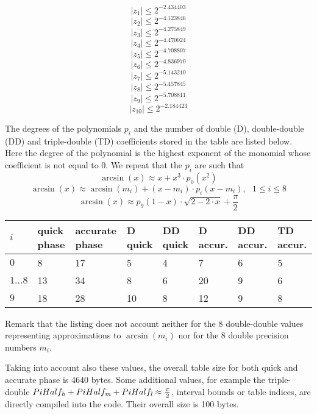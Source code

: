 $$\left \vert z_1 \right \vert  \leq  2^{-2.434403}$$
$$\left \vert z_2 \right \vert  \leq  2^{-4.123846}$$
$$\left \vert z_3 \right \vert  \leq  2^{-4.275849}$$
$$\left \vert z_4 \right \vert  \leq  2^{-4.470024}$$
$$\left \vert z_5 \right \vert  \leq  2^{-4.708807}$$
$$\left \vert z_6 \right \vert  \leq  2^{-4.836970}$$
$$\left \vert z_7 \right \vert  \leq  2^{-5.143210}$$
$$\left \vert z_8 \right \vert  \leq  2^{-5.457845}$$
$$\left \vert z_9 \right \vert  \leq  2^{-5.708811}$$
$$\left \vert z_{10} \right \vert  \leq  2^{-2.184423}$$

The degrees of the polynomials $p_i$ and the number of double (D),
double-double (DD) and triple-double (TD) coefficients stored in the
table are listed below. Here the degree of the polynomial is the
highest exponent of the monomial whose coefficient is not equal to
$0$. We repeat that the $p_i$ are such that
$$\arcsin\left( x \right) \approx x + x^3 \cdot p_0\left( x^2 \right)$$
$$\arcsin\left( x \right) \approx \arcsin\left( m_i \right) + \left(x
- m_i \right) \cdot p_i\left( x - m_i \right), \mbox{~~} 1 \leq i \leq
8$$
$$\arcsin\left( x \right) \approx p_9\left( 1 - x \right) \cdot \sqrt{2 - 2\cdot x} + \frac{\pi}{2}$$

\begin{center}
\begin{tabular}{|l|l|l|l|l|l|l|l|}
\hline
$i$ & quick phase & accurate phase & D quick & DD quick & D accur. & DD accur. & TD accur. \\
\hline
\hline
$0$ & 8 & 17 & 5 & 4 & 7 & 6 & 5 \\
\hline
$1\dots8$ & 13 & 34 & 8 & 6 & 20 & 9 & 6 \\
\hline
$9$ & 18 & 28 & 10 & 8 & 12 & 9 & 8 \\
\hline
\end{tabular}
\end{center}
Remark that the listing does not account neither for the $8$
double-double values representing approximations to $\arcsin\left( m_i
\right)$ nor for the $8$ double precision numbers $m_i$.

Taking into account also these values, the overall table size for both
quick and accurate phase is 4640 bytes. Some additional values, for
example the triple-double $PiHalf_{\mathit{h}} + PiHalf_{\mathit{m}} + PiHalf_{\mathit{l}}
\approx \frac{\pi}{2}$, interval bounds or table indices, are directly
compiled into the code. Their overall size is 100 bytes.

